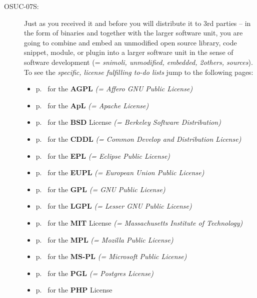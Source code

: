\begin{description}
\item[OSUC-07S:]\label{OSUC-07S-DEF} Just as you received it and before you will
distribute it to 3rd parties -- in the form of binaries and together with the
larger software unit, you are going to combine and embed an unmodified open
source library, code snippet, module, or plugin into a larger software unit in
the sense of software development (= \textit{snimoli, unmodified, embedded,
2others, sources}). To see the \textit{specific, license fulfilling to-do lists}
jump to the following pages:
   \begin{itemize}
    \item p.\ \pageref{OSUC-07S-AGPL} for the \textbf{AGPL}
      \textit{(= Affero GNU Public License)} 
    \item p.\ \pageref{OSUC-07S-Apache20} for the \textbf{ApL}
      \textit{(= Apache License)}
    \item p.\ \pageref{OSUC-07S-BSD} for the \textbf{BSD} License
      \textit{(= Berkeley Software Distribution)}
    \item p.\ \pageref{OSUC-07S-CDDL} for the \textbf{CDDL}
      \textit{(= Common Develop and Distribution License)}  
    \item p.\ \pageref{OSUC-07S-EPL} for the \textbf{EPL}
      \textit{(= Eclipse Public License)}     
    \item p.\ \pageref{OSUC-07S-EUPL} for the \textbf{EUPL}
      \textit{(= European Union Public License)} 
    \item p.\ \pageref{OSUC-07S-GPL} for the \textbf{GPL}
       \textit{(= GNU Public License)} 
    \item p.\ \pageref{OSUC-07S-LGPL} for the \textbf{LGPL}
      \textit{(= Lesser GNU Public License)}           
    \item p.\ \pageref{OSUC-07S-MIT} for the \textbf{MIT} License
       \textit{(= Massachusetts Institute of Technology)} 
    \item p.\ \pageref{OSUC-07S-MPL} for the \textbf{MPL}
      \textit{(= Mozilla Public License)}     
    \item p.\ \pageref{OSUC-07S-MS-PL} for the \textbf{MS-PL}
      \textit{(= Microsoft Public License)} 
    \item p.\ \pageref{OSUC-07S-PGL} for the \textbf{PGL}
      \textit{(= Postgres License)} 
    \item p.\ \pageref{OSUC-07S-PHP} for the \textbf{PHP} License 
  \end{itemize}


\end{description}
